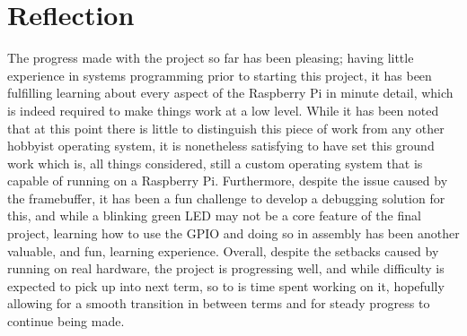 \documentclass[10pt,a4paper]{article}
\begin{document}
\section*{Reflection}
The progress made with the project so far has been pleasing; having little
experience in systems programming prior to starting this project, it has been
fulfilling learning about every aspect of the Raspberry Pi in minute detail,
which is indeed required to make things work at a low level. While it has been
noted that at this point there is little to distinguish this piece of work from
any other hobbyist operating system, it is nonetheless satisfying to have set
this ground work which is, all things considered, still a custom operating
system that is capable of running on a Raspberry Pi. Furthermore, despite the
issue caused by the framebuffer, it has been a fun challenge to develop a
debugging solution for this, and while a blinking green LED may not be a core
feature of the final project, learning how to use the GPIO and doing so in
assembly has been another valuable, and fun, learning experience. Overall,
despite the setbacks caused by running on real hardware, the project is
progressing well, and while difficulty is expected to pick up into next term, so
to is time spent working on it, hopefully allowing for a smooth transition in
between terms and for steady progress to continue being made.



\begin{appendices}


    
    

    
    

\end{appendices}
\end{document}
